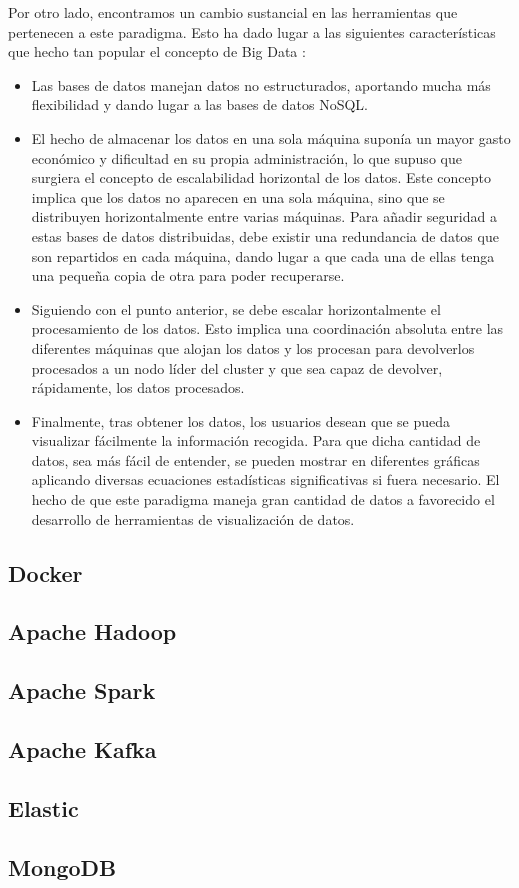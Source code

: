 Por otro lado, encontramos un cambio sustancial en las herramientas que pertenecen a este paradigma. Esto ha dado lugar a las siguientes características que hecho tan popular el concepto de Big Data \cite{BD-6}: 
\begin{itemize}
	\item Las bases de datos manejan datos no estructurados, aportando mucha más flexibilidad y dando lugar a las bases de datos NoSQL.
	\item El hecho de almacenar los datos en una sola máquina suponía un mayor gasto económico y dificultad en su propia administración, lo que supuso que surgiera el concepto de escalabilidad horizontal de los datos. Este concepto implica que los datos no aparecen en una sola máquina, sino que se distribuyen horizontalmente entre varias máquinas. Para añadir seguridad a estas bases de datos distribuidas, debe existir una redundancia de datos que son repartidos en cada máquina, dando lugar a que cada una de ellas tenga una pequeña copia de otra para poder recuperarse.
	\item Siguiendo con el punto anterior, se debe escalar horizontalmente el procesamiento de los datos. Esto implica una coordinación absoluta entre las diferentes máquinas que alojan los datos y los procesan para devolverlos procesados a un nodo líder del cluster y que sea capaz de devolver, rápidamente, los datos procesados.                   
	\item Finalmente, tras obtener los datos, los usuarios desean que se pueda visualizar fácilmente la información recogida. Para que dicha cantidad de datos, sea más fácil de entender, se pueden mostrar en diferentes gráficas aplicando diversas ecuaciones estadísticas significativas si fuera necesario. El hecho de que este paradigma maneja gran cantidad de datos a favorecido el desarrollo de herramientas de visualización de datos. 
\end{itemize}

\subsection{Docker\label{Docker}}
\subsection{Apache Hadoop\label{Hadoop}}
\subsection{Apache Spark\label{Spark}}
\subsection{Apache Kafka\label{Kafka}}
\subsection{Elastic\label{Elastic}}
\subsection{MongoDB\label{MongoDB}}
